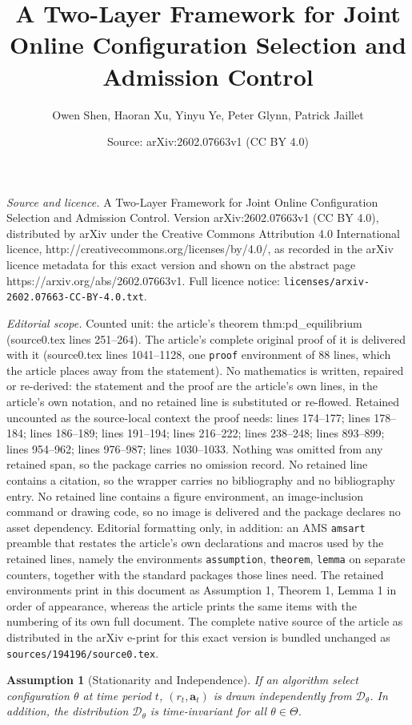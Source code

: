 \documentclass[10pt,a4paper]{amsart}
\title{A Two-Layer Framework for Joint Online Configuration Selection and Admission Control}
\author{Owen Shen, Haoran Xu, Yinyu Ye, Peter Glynn, Patrick Jaillet}
\date{Source: arXiv:2602.07663v1 (CC BY 4.0)}
\newtheorem{assumption}{Assumption}
\newcommand{\ba}{\mathbf{a}}
\newcommand{\cD}{\mathcal{D}}
\begin{document}
\maketitle

\noindent\emph{Source and licence.} A Two-Layer Framework for Joint Online Configuration Selection and Admission Control. Version arXiv:2602.07663v1 (CC BY 4.0), distributed by arXiv under the Creative Commons Attribution 4.0 International licence, http://creativecommons.org/licenses/by/4.0/, as recorded in the arXiv licence metadata for this exact version and shown on the abstract page https://arxiv.org/abs/2602.07663v1. Full licence notice: \texttt{licenses/arxiv-2602.07663-CC-BY-4.0.txt}.\par\smallskip

\noindent\textit{Editorial scope.} Counted unit: the article's theorem thm:pd\_equilibrium (source0.tex lines 251--264). The article's complete original proof of it is delivered with it (source0.tex lines 1041--1128, one \texttt{proof} environment of 88 lines, which the article places away from the statement). No mathematics is written, repaired or re-derived: the statement and the proof are the article's own lines, in the article's own notation, and no retained line is substituted or re-flowed.  Retained uncounted as the source-local context the proof needs: lines 174--177; lines 178--184; lines 186--189; lines 191--194; lines 216--222; lines 238--248; lines 893--899; lines 954--962; lines 976--987; lines 1030--1033.  Nothing was omitted from any retained span, so the package carries no omission record.  No retained line contains a citation, so the wrapper carries no bibliography and no bibliography entry.  No retained line contains a figure environment, an image-inclusion command or drawing code, so no image is delivered and the package declares no asset dependency.  Editorial formatting only, in addition: an AMS \texttt{amsart} preamble that restates the article's own declarations and macros used by the retained lines, namely the environments \texttt{assumption}, \texttt{theorem}, \texttt{lemma} on separate counters, together with the standard packages those lines need.  The retained environments print in this document as Assumption 1, Theorem 1, Lemma 1 in order of appearance, whereas the article prints the same items with the numbering of its own full document.  The complete native source of the article as distributed in the arXiv e-print for this exact version is bundled unchanged as \texttt{sources/194196/source0.tex}.
\begin{assumption}[Stationarity and Independence]
\label{assump:iid}
If an algorithm select configuration $\theta$ at time period $t$, $(r_t,\ba_t)$ is drawn independently from $\cD_\theta$. In addition, the distribution $\cD_\theta$ is time-invariant for all $\theta\in\Theta$.
\end{assumption}
\end{document}
